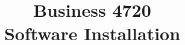 \documentclass{article}
\title{Business 4720\\ \vspace{\baselineskip}
Software Installation}
\begin{document}
\maketitle

\vfill

\clearpage


\end{document}

